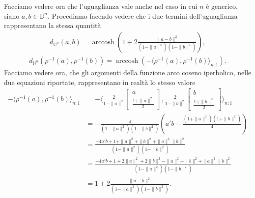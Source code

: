 \documentclass[a4paper, 12pt]{article}
\DeclareMathOperator\arccosh{arccosh}
\begin{document}
\\\\
Facciamo vedere ora che l'uguaglianza vale anche nel caso in cui $n$ è generico, siano $a, b \in \mathbb{D}^n$. Procediamo facendo vedere che i due termini dell'uguaglianza rappresentano la stessa quantità\\
\begin{equation*}\begin{gathered}
d_{\mathbb{D}^n}(a,b) = \arccosh(1 + 2\frac{\| a - b \|^2}{(1 - \| a \|^2)(1 - \| b \|^2)}),
\end{gathered}\end{equation*}
\begin{equation*}\begin{gathered}
d_{\mathbb{H}^n}(\rho^{-1}(a),\rho^{-1}(b)) = \arccosh(- \langle \rho^{-1}(a),\rho^{-1}(b) \rangle_{n:1}).
\end{gathered}\end{equation*}
Facciamo vedere ora, che gli argomenti della funzione arco coseno iperbolico, nelle due equazioni riportate, rappresentano in realtà lo stesso valore
\begin{equation*}\begin{split}
- \langle \rho^{-1}(a),\rho^{-1}(b) \rangle_{n:1} &= - \langle \frac{2}{1 - \| a \|^2} \begin{bmatrix} a \\ \frac{1 + \| a \|^2}{2} \end{bmatrix}, \frac{2}{1 - \| b \|^2} \begin{bmatrix} b \\ \frac{1 + \| b \|^2}{2} \end{bmatrix} \rangle_{n:1}\\
&=-\frac{4}{(1 - \| a \|^2)(1 - \| b \|^2)} \left( a'b - \frac{(1 + \| a \|^2)(1 + \| b \|^2)}{4} \right)\\
&=\frac{-4a'b + 1 + \| a \|^2 + \| b \|^2 + \| a \|^2 \| b \|^2}{(1 - \| a \|^2)(1 - \| b \|^2)}\\
&=\frac{-4a'b + 1 + 2\| a \|^2 + 2\| b \|^2 - \| a \|^2 - \| b \|^2 + \| a \|^2 \| b \|^2}{(1 - \| a \|^2)(1 - \| b \|^2)}\\
&=1 + 2 \frac{\| a - b \|^2}{(1 - \| a \|^2)(1 - \| b \|^2)}.
\end{split}\end{equation*}
\end{document}
